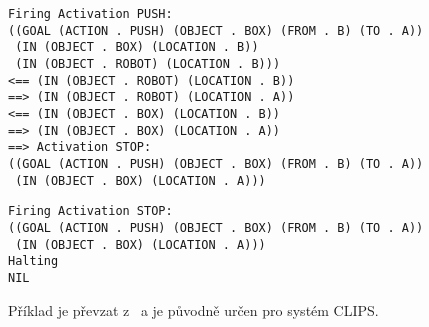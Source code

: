 \begin{verbatim}
Firing Activation PUSH:
((GOAL (ACTION . PUSH) (OBJECT . BOX) (FROM . B) (TO . A))
 (IN (OBJECT . BOX) (LOCATION . B))
 (IN (OBJECT . ROBOT) (LOCATION . B)))
<== (IN (OBJECT . ROBOT) (LOCATION . B))
==> (IN (OBJECT . ROBOT) (LOCATION . A))
<== (IN (OBJECT . BOX) (LOCATION . B))
==> (IN (OBJECT . BOX) (LOCATION . A))
==> Activation STOP:
((GOAL (ACTION . PUSH) (OBJECT . BOX) (FROM . B) (TO . A))
 (IN (OBJECT . BOX) (LOCATION . A)))
\end{verbatim}
\begin{verbatim}
Firing Activation STOP:
((GOAL (ACTION . PUSH) (OBJECT . BOX) (FROM . B) (TO . A))
 (IN (OBJECT . BOX) (LOCATION . A)))
Halting
NIL
\end{verbatim}
Příklad je převzat z~\cite{introduction} a je původně určen pro systém CLIPS.
